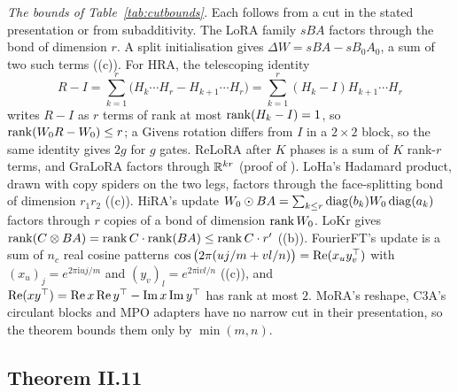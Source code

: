 \noindent\emph{The bounds of Table~\ref{tab:cutbounds}.} Each follows from a cut in the stated presentation or from
subadditivity. The LoRA family $sBA$ factors through the bond of dimension $r$. A split initialisation gives
$\Delta W=sBA-sB_0A_0$, a sum of two such terms ((c)). For HRA, the telescoping identity
\begin{equation*}
  R-I=\sum_{k=1}^r\big(H_k\cdots H_r-H_{k+1}\cdots H_r\big)=\sum_{k=1}^r(H_k-I)H_{k+1}\cdots H_r
\end{equation*}
writes $R-I$ as $r$ terms of rank at most $\operatorname{rank}(H_k-I)=1$, so $\operatorname{rank}(W_0R-W_0)\le r$; a Givens rotation differs from $I$ in a
$2\times2$ block, so the same identity gives $2g$ for $g$ gates. ReLoRA after $K$ phases is a sum of $K$ rank-$r$ terms, and
GraLoRA factors through $\mathbb{R}^{kr}$ (proof of ). LoHa's Hadamard product, drawn with copy spiders on
the two legs, factors through the face-splitting bond of dimension $r_1r_2$ ((c)). HiRA's update
$W_0\odot BA=\sum_{k\le r}\operatorname{diag}(b_k)W_0\operatorname{diag}(a_k)$ factors through $r$ copies of a bond of dimension $\operatorname{rank} W_0$. LoKr gives
$\operatorname{rank}(C\otimes BA)=\operatorname{rank} C\cdot\operatorname{rank}(BA)\le\operatorname{rank} C\cdot r'$ ((b)). FourierFT's update is a sum of $n_c$ real cosine
patterns $\cos\big(2\pi(uj/m+vl/n)\big)=\operatorname{Re}(x_uy_v^{\top})$ with $(x_u)_j=e^{2\pi\mathrm iuj/m}$ and
$(y_v)_l=e^{2\pi\mathrm ivl/n}$ ((c)), and $\operatorname{Re}(xy^{\top})=\operatorname{Re}x\operatorname{Re}y^{\top}-
\operatorname{Im}x\operatorname{Im}y^{\top}$ has rank at most $2$. MoRA's reshape, C3A's circulant blocks and MPO adapters have
no narrow cut in their presentation, so the theorem bounds them only by $\min(m,n)$.

\subsection{Theorem II.11}\label{proof:II.11}

